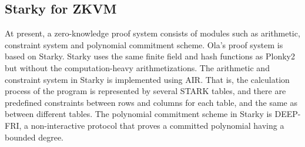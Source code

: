 \subsection{Starky for ZKVM}\label{section: starky-zkvm}

At present, a zero-knowledge proof system consists of modules such as arithmetic, constraint system and polynomial commitment scheme. Ola's proof system is based on Starky. Starky uses the same finite field and hash functions as Plonky2 but without the computation-heavy arithmetizations. The arithmetic and constraint system in Starky is implemented using AIR. That is, the calculation process of the program is represented by several STARK tables, and there are predefined constraints between rows and columns for each table, and the same as between different tables. The polynomial commitment scheme in Starky is DEEP-FRI, a non-interactive protocol that proves a committed polynomial having a bounded degree.







